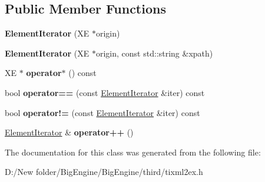 \subsection*{Public Member Functions}
\begin{DoxyCompactItemize}
\item 
\mbox{\label{classtinyxml2_1_1tixml2ex_1_1_element_iterator_a7efc3de11579edf03e184e52b9dbe5a0}} 
{\bfseries Element\+Iterator} (XE $\ast$origin)
\item 
\mbox{\label{classtinyxml2_1_1tixml2ex_1_1_element_iterator_aabc2916da03872c4c95555440565a1a5}} 
{\bfseries Element\+Iterator} (XE $\ast$origin, const std\+::string \&xpath)
\item 
\mbox{\label{classtinyxml2_1_1tixml2ex_1_1_element_iterator_af4b540b93783fe97d61bd99d6ef9872e}} 
XE $\ast$ {\bfseries operator$\ast$} () const
\item 
\mbox{\label{classtinyxml2_1_1tixml2ex_1_1_element_iterator_a0112de1ad7e8161ffffbe766c9d4ebe8}} 
bool {\bfseries operator==} (const \mbox{\hyperlink{classtinyxml2_1_1tixml2ex_1_1_element_iterator}{Element\+Iterator}} \&iter) const
\item 
\mbox{\label{classtinyxml2_1_1tixml2ex_1_1_element_iterator_ad4e3f47949ac218a0ea7ad9995e45415}} 
bool {\bfseries operator!=} (const \mbox{\hyperlink{classtinyxml2_1_1tixml2ex_1_1_element_iterator}{Element\+Iterator}} \&iter) const
\item 
\mbox{\label{classtinyxml2_1_1tixml2ex_1_1_element_iterator_a56a196047e94169e52201837f41ecdb5}} 
\mbox{\hyperlink{classtinyxml2_1_1tixml2ex_1_1_element_iterator}{Element\+Iterator}} \& {\bfseries operator++} ()
\end{DoxyCompactItemize}


The documentation for this class was generated from the following file\+:\begin{DoxyCompactItemize}
\item 
D\+:/\+New folder/\+Big\+Engine/\+Big\+Engine/third/tixml2ex.\+h\end{DoxyCompactItemize}
